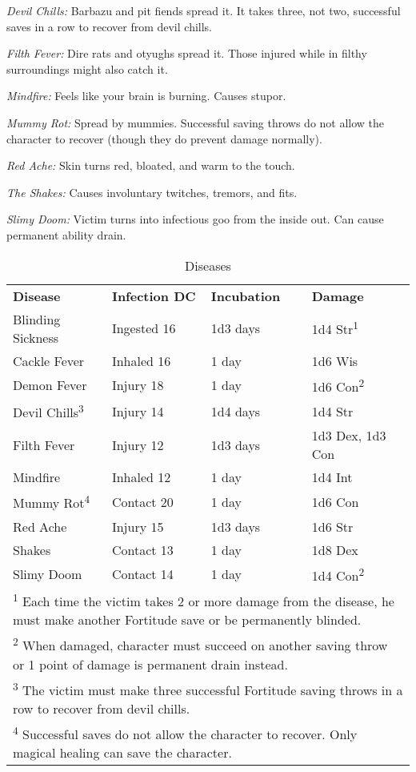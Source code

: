 \textit{Devil Chills:} Barbazu and pit fiends spread it. It takes three, not two, 
successful saves in a row to recover from devil chills.

\textit{Filth Fever:} Dire rats and otyughs spread it. Those injured while in filthy 
surroundings might also catch it.

\textit{Mindfire:} Feels like your brain is burning. Causes stupor.

\textit{Mummy Rot:} Spread by mummies. Successful saving throws do not allow the 
character to recover (though they do prevent damage normally).

\textit{Red Ache:} Skin turns red, bloated, and warm to the touch.

\textit{The Shakes:} Causes involuntary twitches, tremors, and fits.

\textit{Slimy Doom:} Victim turns into infectious goo from the inside out. Can 
cause permanent ability drain.

\begin{table}[htb]
\mcinherit
\caption{Diseases}
\centering
\begin{tabular}{llll}
\textbf{Disease} & \textbf{Infection DC} & \textbf{Incubation} & \textbf{Damage}\\
Blinding Sickness & Ingested 16 & 1d3 days & 1d4 Str\textsuperscript{1}\\
Cackle Fever & Inhaled 16 & 1 day & 1d6 Wis\\
Demon Fever & Injury 18 & 1 day & 1d6 Con\textsuperscript{2}\\
Devil Chills\textsuperscript{3} & Injury 14 & 1d4 days & 1d4 Str\\
Filth Fever & Injury 12 & 1d3 days & 1d3 Dex, 1d3 Con\\
Mindfire & Inhaled 12 & 1 day & 1d4 Int\\
Mummy Rot\textsuperscript{4} & Contact 20 & 1 day & 1d6 Con\\
Red Ache & Injury 15 & 1d3 days & 1d6 Str\\
Shakes & Contact 13 & 1 day & 1d8 Dex\\
Slimy Doom & Contact 14 & 1 day & 1d4 Con\textsuperscript{2}\\
\multicolumn{4}{p{10cm}}{\textsuperscript{1} Each time the victim takes 2 or more damage from the disease, he must make another Fortitude save or be permanently blinded.}\\
\multicolumn{4}{p{10cm}}{\textsuperscript{2} When damaged, character must succeed on another saving throw or 1 point of damage is permanent drain instead.}\\
\multicolumn{4}{p{10cm}}{\textsuperscript{3} The victim must make three successful Fortitude saving throws in a row to recover from devil chills.}\\
\multicolumn{4}{p{10cm}}{\textsuperscript{4} Successful saves do not allow the character to recover. Only magical healing can save the character.}\\
\end{tabular}
\end{table}


